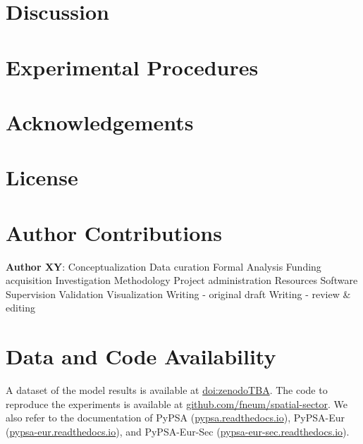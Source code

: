 \documentclass[11pt,1p]{elsarticle}
\begin{document}



\section*{Discussion}
\label{sec:discussion}



\section*{Experimental Procedures}
\label{sec:methods}

\begin{small}

\end{small}

\section*{Acknowledgements}
\small


\section*{License}

\section*{Author Contributions}


\textbf{Author XY}:
Conceptualization
Data curation
Formal Analysis
Funding acquisition
Investigation
Methodology
Project administration
Resources
Software
Supervision
Validation
Visualization
Writing - original draft
Writing - review \& editing


\section*{Data and Code Availability}

A dataset of the model results is available at \href{zenodoTBA}{doi:zenodoTBA}. 
The code to reproduce the experiments is available at \href{https://github.com/fneum/spatial-sector}{github.com/fneum/spatial-sector}.
We also refer to the documentation of PyPSA (\href{https://pypsa.readthedocs.io}{pypsa.readthedocs.io}),
PyPSA-Eur (\href{https://pypsa-eur.readthedocs.io}{pypsa-eur.readthedocs.io}), and
PyPSA-Eur-Sec (\href{https://pypsa-eur-sec.readthedocs.io}{pypsa-eur-sec.readthedocs.io}).
\end{document}
